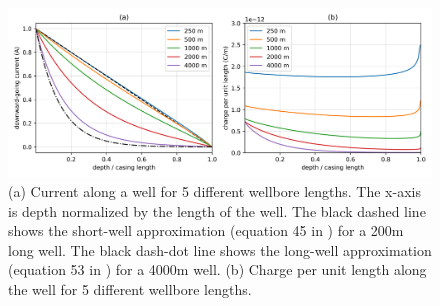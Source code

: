 \begin{figure}[htb]
    \begin{center}
    \includegraphics[width=\columnwidth]{figures/casing_software/kaufman_finite_well.png}
    \end{center}
\caption{
    (a) Current along a well for 5 different wellbore lengths.
    The x-axis is depth normalized by the length of the well. The black
    dashed line shows the short-well approximation (equation 45 in \cite{Kaufman1993})
    for a 200m long well. The black dash-dot line shows the long-well approximation
    (equation 53 in \cite{Kaufman1993}) for a 4000m well.
    (b) Charge per unit length along the well for 5 different wellbore lengths.
}
\label{fig:kaufman_finite_well}
\end{figure}
